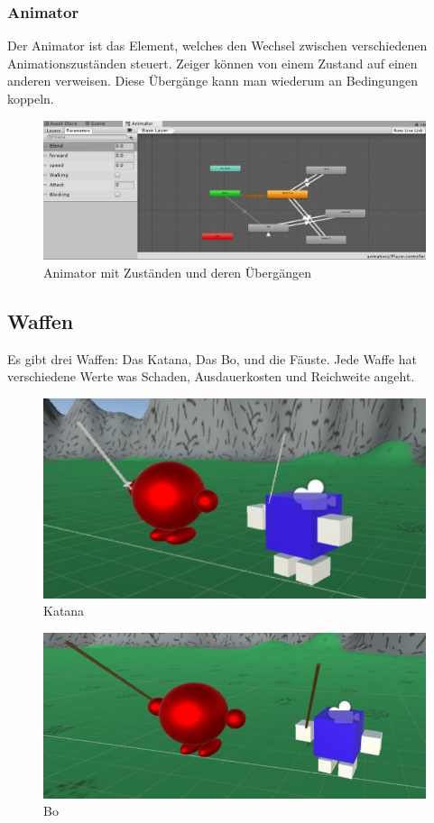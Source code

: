 \subsubsection{Animator}
Der Animator ist das Element, welches den Wechsel zwischen verschiedenen Animationszuständen steuert. Zeiger können von einem Zustand auf einen anderen verweisen. Diese Übergänge kann man wiederum an Bedingungen koppeln.
\begin{figure}[H]
\includegraphics[scale=0.67]{screenshots/animator.png}
\caption{Animator mit Zuständen und deren Übergängen}
\end{figure}

\subsection{Waffen}

Es gibt drei  Waffen: Das Katana, Das Bo, und die Fäuste.
Jede Waffe hat verschiedene Werte was Schaden, Ausdauerkosten und Reichweite angeht.
\begin{figure}[H]
\includegraphics[scale=1]{screenshots/katana.png}
\caption{Katana}
\end{figure}

\begin{figure}[H]
\includegraphics[scale=1]{screenshots/bo.png}
\caption{Bo}
\end{figure}



